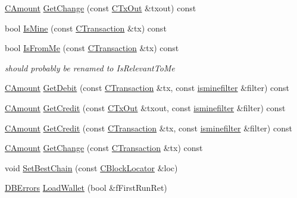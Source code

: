 \begin{DoxyCompactItemize}
\item 
\hyperlink{amount_8h_a4eaf3a5239714d8c45b851527f7cb564}{C\+Amount} \hyperlink{class_c_wallet_a9bec62a32e693ed55169ef4a455f3e69}{Get\+Change} (const \hyperlink{class_c_tx_out}{C\+Tx\+Out} \&txout) const 
\item 
bool \hyperlink{class_c_wallet_a181e0a9091e77ce9da97e4cef3266b9f}{Is\+Mine} (const \hyperlink{class_c_transaction}{C\+Transaction} \&tx) const 
\item 
bool \hyperlink{class_c_wallet_a478dd2c26c00ac0d45684f77a936761f}{Is\+From\+Me} (const \hyperlink{class_c_transaction}{C\+Transaction} \&tx) const 
\begin{DoxyCompactList}\small\item\em should probably be renamed to Is\+Relevant\+To\+Me \end{DoxyCompactList}\item 
\hyperlink{amount_8h_a4eaf3a5239714d8c45b851527f7cb564}{C\+Amount} \hyperlink{class_c_wallet_abc7c37fb7922c68460690b6cf653e203}{Get\+Debit} (const \hyperlink{class_c_transaction}{C\+Transaction} \&tx, const \hyperlink{script_8h_aaa5e1639d76aef50f70532acc3302c4b}{isminefilter} \&filter) const 
\item 
\hyperlink{amount_8h_a4eaf3a5239714d8c45b851527f7cb564}{C\+Amount} \hyperlink{class_c_wallet_a9a8ab6f6af8354783f96034e9223e0f2}{Get\+Credit} (const \hyperlink{class_c_tx_out}{C\+Tx\+Out} \&txout, const \hyperlink{script_8h_aaa5e1639d76aef50f70532acc3302c4b}{isminefilter} \&filter) const 
\item 
\hyperlink{amount_8h_a4eaf3a5239714d8c45b851527f7cb564}{C\+Amount} \hyperlink{class_c_wallet_aeffa4ec3b60930bed2bd50ab5e346e75}{Get\+Credit} (const \hyperlink{class_c_transaction}{C\+Transaction} \&tx, const \hyperlink{script_8h_aaa5e1639d76aef50f70532acc3302c4b}{isminefilter} \&filter) const 
\item 
\hyperlink{amount_8h_a4eaf3a5239714d8c45b851527f7cb564}{C\+Amount} \hyperlink{class_c_wallet_a62c0b661d3dc02530de29fc1d1b714c3}{Get\+Change} (const \hyperlink{class_c_transaction}{C\+Transaction} \&tx) const 
\item 
void \hyperlink{class_c_wallet_a1697a92171b4359f49b38aed643cf92b}{Set\+Best\+Chain} (const \hyperlink{class_c_block_locator}{C\+Block\+Locator} \&loc)
\item 
\hyperlink{walletdb_8h_a7558d92e9ea1d446075da1b514c4a944}{D\+B\+Errors} \hyperlink{class_c_wallet_a5d7b244b8ed0cbe24233ee0b6ca3cae0}{Load\+Wallet} (bool \&f\+First\+Run\+Ret)
\item 

\end{DoxyCompactItemize}
